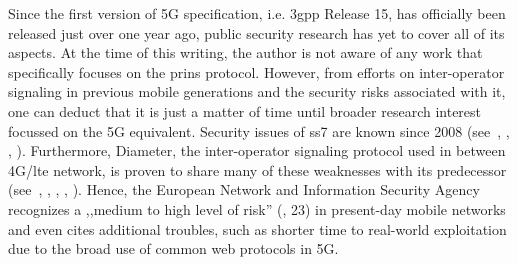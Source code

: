 Since the first version of 5G specification, i.e. \gls{3gpp} Release 15, has officially been released just over one year ago, public security research has yet to cover all of its aspects.
At the time of this writing, the author is not aware of any work that specifically focuses on the \gls{prins} protocol.
However, from efforts on inter-operator signaling in previous mobile generations and the security risks associated with it, one can deduct that it is just a matter of time until broader research interest focussed on the 5G equivalent.
Security issues of \gls{ss7} are known since 2008 (see~\cite{engel2008locating}, \cite{engel2014locate}, \cite{oliveira2014world}, \cite{puzankov2014how}).
Furthermore, Diameter, the inter-operator signaling protocol used in between 4G/\gls{lte} network, is proven to share many of these weaknesses with its predecessor (see~\cite{rao2015unblock}, \cite{rao2016privacy}, \cite{rao2016where}, \cite{holtmanns2016user}, \cite{holtmanns2017sms}).
Hence, the European Network and Information Security Agency recognizes a ,,medium to high level of risk'' (\cite{enisa2018signal}, 23) in present-day mobile networks and even cites additional troubles, such as shorter time to real-world exploitation due to the broad use of common web protocols in 5G.

